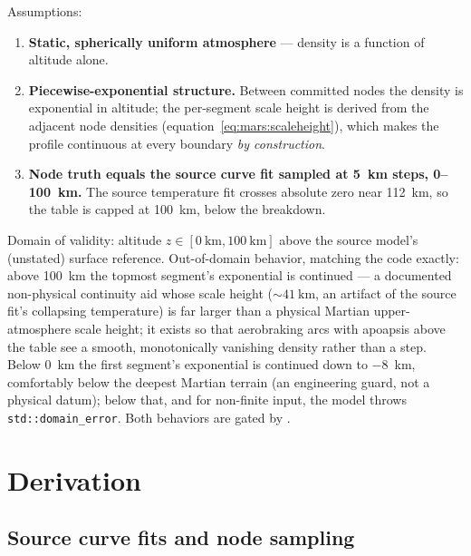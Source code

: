 Assumptions:
\begin{enumerate}
  \item \textbf{Static, spherically uniform atmosphere} --- density is a
    function of altitude alone.
  \item \textbf{Piecewise-exponential structure.} Between committed
    nodes the density is exponential in altitude; the per-segment scale
    height is derived from the adjacent node densities
    (equation~\eqref{eq:mars:scaleheight}), which makes the profile
    continuous at every boundary \emph{by construction}.
  \item \textbf{Node truth equals the source curve fit sampled at
    \qty{5}{\kilo\metre} steps, 0--\qty{100}{\kilo\metre}.} The source
    temperature fit crosses absolute zero near \qty{112}{\kilo\metre},
    so the table is capped at \qty{100}{\kilo\metre}, below the
    breakdown.
\end{enumerate}

Domain of validity: altitude $z \in [\qty{0}{\kilo\metre},
\qty{100}{\kilo\metre}]$ above the source model's (unstated) surface
reference. Out-of-domain behavior, matching the code exactly: above
\qty{100}{\kilo\metre} the topmost segment's exponential is continued ---
a documented non-physical continuity aid whose scale height
($\sim\qty{41}{\kilo\metre}$, an artifact of the source fit's collapsing
temperature) is far larger than a physical Martian upper-atmosphere
scale height; it exists so that aerobraking arcs with apoapsis above the
table see a smooth, monotonically vanishing density rather than a step.
Below \qty{0}{\kilo\metre} the first segment's exponential is continued
down to \qty{-8}{\kilo\metre}, comfortably below the deepest Martian
terrain (an engineering guard, not a physical datum); below that, and
for non-finite input, the model throws \texttt{std::domain\_error}.
Both behaviors are gated by .

\section{Derivation}
\label{sec:mars:derivation}

\subsection{Source curve fits and node sampling}

